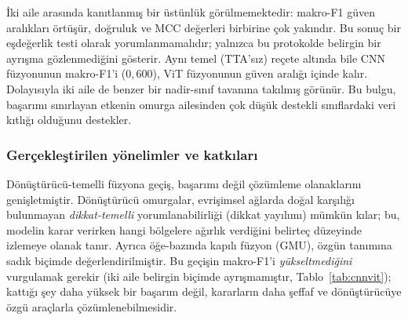 \begin{table}[H]
  \centering
  \caption{Kontrollü karşılaştırma: aynı veri kümesi, protokol ve füzyon çerçevesi
  altında CNN-omurgalı ve ViT-omurgalı füzyon (havuzlanmış OOF, $n=10{.}662$; makro-F1
  ana ölçüt). Reçete: ViT temel (TTA kazanç vermedi), CNN test zamanı veri artırmalı.}
  \label{tab:cnnvit}
\end{table}

İki aile arasında kanıtlanmış bir üstünlük görülmemektedir: makro-F1 güven
aralıkları örtüşür, doğruluk ve MCC değerleri birbirine çok yakındır. Bu sonuç bir
eşdeğerlik testi olarak yorumlanmamalıdır; yalnızca bu protokolde belirgin bir
ayrışma gözlenmediğini gösterir. Aynı temel (TTA'sız) reçete altında bile CNN
füzyonunun makro-F1'i ($0{,}600$), ViT füzyonunun güven aralığı içinde kalır.
Dolayısıyla iki aile de benzer bir nadir-sınıf tavanına takılmış görünür. Bu bulgu,
başarımı sınırlayan etkenin omurga ailesinden çok düşük destekli sınıflardaki veri
kıtlığı olduğunu destekler.

\subsubsection{Gerçekleştirilen yönelimler ve katkıları}
Dönüştürücü-temelli füzyona geçiş, başarımı değil çözümleme olanaklarını
genişletmiştir. Dönüştürücü omurgalar, evrişimsel ağlarda doğal karşılığı bulunmayan
\emph{dikkat-temelli} yorumlanabilirliği (dikkat yayılımı) mümkün kılar; bu, modelin
karar verirken hangi bölgelere ağırlık verdiğini belirteç düzeyinde izlemeye olanak
tanır. Ayrıca öğe-bazında kapılı füzyon (GMU), özgün tanımına sadık biçimde
değerlendirilmiştir. Bu geçişin makro-F1'i \emph{yükseltmediğini} vurgulamak gerekir
(iki aile belirgin biçimde ayrışmamıştır, Tablo~\ref{tab:cnnvit}); kattığı şey daha yüksek bir başarım değil,
kararların daha şeffaf ve dönüştürücüye özgü araçlarla çözümlenebilmesidir.


